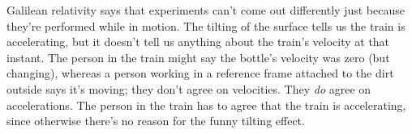 Galilean relativity says that experiments can't come out differently
just because they're performed while in motion. The tilting of the
surface tells us the train is accelerating, but it doesn't tell us
anything about the train's velocity at that instant. The person in
the train might say the bottle's velocity was zero (but changing),
whereas a person working in a reference frame attached to the dirt
outside says it's moving; they don't agree on velocities. They
\emph{do} agree on accelerations. The person in the train has to
agree that the train is accelerating, since otherwise there's no
reason for the funny tilting effect.
